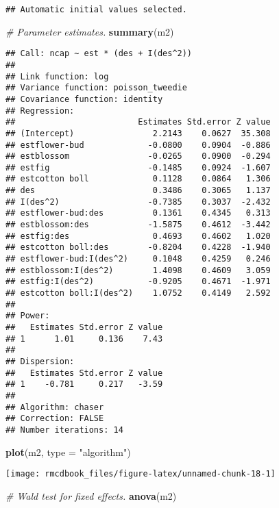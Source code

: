 \documentclass[9pt,a5paper,]{book}
\newenvironment{Shaded}{}{}
\newcommand{\KeywordTok}[1]{\textbf{{#1}}}
\newcommand{\DataTypeTok}[1]{\underline{{#1}}}
\newcommand{\StringTok}[1]{{#1}}
\newcommand{\CommentTok}[1]{\textit{{#1}}}
\newcommand{\NormalTok}[1]{{#1}}
\renewenvironment{Shaded}{\color{inputcolor}}{}
\renewcommand{\DataTypeTok}[1]{{#1}}
\theoremstyle{definition}
\theoremstyle{definition}
\theoremstyle{remark}
\begin{document}
\begin{verbatim}
## Automatic initial values selected.
\end{verbatim}

\begin{Shaded}
\begin{Highlighting}[]
\CommentTok{# Parameter estimates.}
\KeywordTok{summary}\NormalTok{(m2)}
\end{Highlighting}
\end{Shaded}

\begin{verbatim}
## Call: ncap ~ est * (des + I(des^2))
## 
## Link function: log
## Variance function: poisson_tweedie
## Covariance function: identity
## Regression:
##                         Estimates Std.error Z value
## (Intercept)                2.2143    0.0627  35.308
## estflower-bud             -0.0800    0.0904  -0.886
## estblossom                -0.0265    0.0900  -0.294
## estfig                    -0.1485    0.0924  -1.607
## estcotton boll             0.1128    0.0864   1.306
## des                        0.3486    0.3065   1.137
## I(des^2)                  -0.7385    0.3037  -2.432
## estflower-bud:des          0.1361    0.4345   0.313
## estblossom:des            -1.5875    0.4612  -3.442
## estfig:des                 0.4693    0.4602   1.020
## estcotton boll:des        -0.8204    0.4228  -1.940
## estflower-bud:I(des^2)     0.1048    0.4259   0.246
## estblossom:I(des^2)        1.4098    0.4609   3.059
## estfig:I(des^2)           -0.9205    0.4671  -1.971
## estcotton boll:I(des^2)    1.0752    0.4149   2.592
## 
## Power:
##   Estimates Std.error Z value
## 1      1.01     0.136    7.43
## 
## Dispersion:
##   Estimates Std.error Z value
## 1    -0.781     0.217   -3.59
## 
## Algorithm: chaser
## Correction: FALSE
## Number iterations: 14
\end{verbatim}

\begin{Shaded}
\begin{Highlighting}[]
\KeywordTok{plot}\NormalTok{(m2, }\DataTypeTok{type =} \StringTok{"algorithm"}\NormalTok{)}
\end{Highlighting}
\end{Shaded}

\begin{center}\texttt{[image: rmcdbook\_files/figure-latex/unnamed-chunk-18-1]} \end{center}

\begin{Shaded}
\begin{Highlighting}[]
\CommentTok{# Wald test for fixed effects.}
\KeywordTok{anova}\NormalTok{(m2)}
\end{Highlighting}
\end{Shaded}
\end{document}
